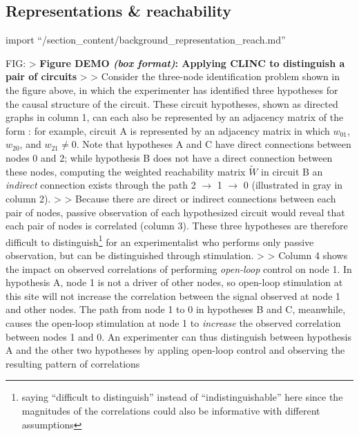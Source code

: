 \hypertarget{representations-reachability}{%
\subsection{Representations \&
reachability}\label{representations-reachability}}

import ``/section\_content/background\_representation\_reach.md''

FIG: %
\textgreater{} \textbf{Figure DEMO \emph{(box format)}: Applying CLINC
to distinguish a pair of circuits} \textgreater{} \textgreater{}
Consider the three-node identification problem shown in the figure
above, in which the experimenter has identified three hypotheses for the
causal structure of the circuit. These circuit hypotheses, shown as
directed graphs in column 1, can each also be represented by an
adjacency matrix of the form : for example, circuit A is represented by
an adjacency matrix in which \(w_{01}\), \(w_{20}\), and
\(w_{21} \neq 0\). Note that hypotheses A and C have direct connections
between nodes 0 and 2; while hypothesis B does not have a direct
connection between these nodes, computing the weighted reachability
matrix \(\widetilde{W}\) in circuit B an \emph{indirect} connection
exists through the path 2 \(\to\) 1 \(\to\) 0 (illustrated in gray in
column 2). \textgreater{} \textgreater{} Because there are direct or
indirect connections between each pair of nodes, passive observation of
each hypothesized circuit would reveal that each pair of nodes is
correlated (column 3). These three hypotheses are therefore difficult to
distinguish\footnote{saying ``difficult to distinguish'' instead of
  ``indistinguishable'' here since the magnitudes of the correlations
  could also be informative with different assumptions} for an
experimentalist who performs only passive observation, but can be
distinguished through stimulation. \textgreater{} \textgreater{} Column
4 shows the impact on observed correlations of performing
\emph{open-loop} control on node 1. In hypothesis A, node 1 is not a
driver of other nodes, so open-loop stimulation at this site will not
increase the correlation between the signal observed at node 1 and other
nodes. The path from node 1 to 0 in hypotheses B and C, meanwhile,
causes the open-loop stimulation at node 1 to \emph{increase} the
observed correlation between nodes 1 and 0. An experimenter can thus
distinguish between hypothesis A and the other two hypotheses by appling
open-loop control and observing the resulting pattern of correlations
